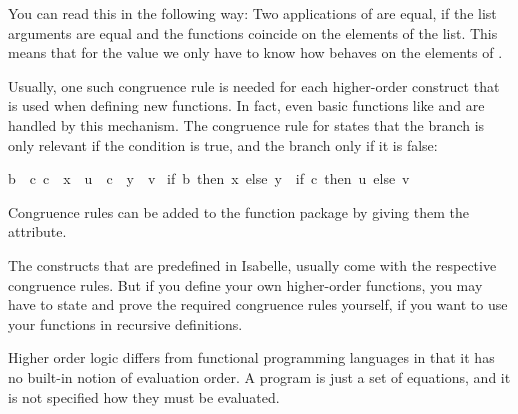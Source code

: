 \begin{isabellebody}
\begin{isamarkuptxt}
  You can read this in the following way: Two applications of  are equal, if the list arguments are equal and the functions
  coincide on the elements of the list. This means that for the value 
   we only have to know how  behaves on
  the elements of .

  Usually, one such congruence rule is
  needed for each higher-order construct that is used when defining
  new functions. In fact, even basic functions like  and  are handled by this mechanism. The congruence
  rule for  states that the  branch is only
  relevant if the condition is true, and the  branch only if it
  is false:

  \begin{isabelle}%
{}{}b\ {}\ {}c{}\ {}c\ {}\ {}x\ {}\ {}u{}\ {}\ {}c\ {}\ {}y\ {}\ {}v{}\isanewline
{}\ {}if\ {}b\ then\ {}x\ else\ {}y{}\ {}\ {}if\ {}c\ then\ {}u\ else\ {}v{}%
\end{isabelle}
  
  Congruence rules can be added to the
  function package by giving them the  attribute.

  The constructs that are predefined in Isabelle, usually
  come with the respective congruence rules.
  But if you define your own higher-order functions, you may have to
  state and prove the required congruence rules yourself, if you want to use your
  functions in recursive definitions.%
\end{isamarkuptxt}%
\isamarkuptrue%
%
\endisatagproof
{\isafoldproof}%
%
\isadelimproof
%
\endisadelimproof
%
\isamarkuptrue%
%
\begin{isamarkuptext}%
Higher order logic differs from functional programming languages in
  that it has no built-in notion of evaluation order. A program is
  just a set of equations, and it is not specified how they must be
  evaluated. 


\end{isamarkuptext}
\end{isabellebody}
